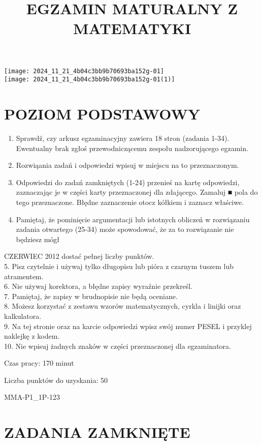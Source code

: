 \documentclass[10pt]{article}
\title{EGZAMIN MATURALNY Z MATEMATYKI }
\author{}
\date{}
\begin{document}
\maketitle
\texttt{[image: 2024\_11\_21\_4b04c3bb9b70693ba152g-01]}\\
\texttt{[image: 2024\_11\_21\_4b04c3bb9b70693ba152g-01(1)]}

\section*{POZIOM PODSTAWOWY}
\begin{enumerate}
  \item Sprawdź, czy arkusz egzaminacyjny zawiera 18 stron (zadania 1-34). Ewentualny brak zgłoś przewodniczącemu zespołu nadzorującego egzamin.
  \item Rozwiąania zadań i odpowiedzi wpisuj w miejscu na to przeznaczonym.
  \item Odpowiedzi do zadań zamkniętych (1-24) przenieś na kartę odpowiedzi, zaznaczając je w części karty przeznaczonej dla zdającego. Zamaluj ■ pola do tego przeznaczone. Błędne zaznaczenie otocz kółkiem i zaznacz właściwe.
  \item Pamiętaj, że pominięcie argumentacji lub istotnych obliczeń w rozwiązaniu zadania otwartego (25-34) może spowodować, że za to rozwiązanie nie będziesz mógł
\end{enumerate}

CZERWIEC 2012 dostać pełnej liczby punktów.\\
5. Pisz czytelnie i używaj tylko długopisu lub pióra z czarnym tuszem lub atramentem.\\
6. Nie używaj korektora, a błędne zapisy wyraźnie przekreśl.\\
7. Pamiętaj, że zapisy w brudnopisie nie będą oceniane.\\
8. Możesz korzystać z zestawu wzorów matematycznych, cyrkla i linijki oraz kalkulatora.\\
9. Na tej stronie oraz na karcie odpowiedzi wpisz swój numer PESEL i przyklej naklejkę z kodem.\\
10. Nie wpisuj żadnych znaków w części przeznaczonej dla egzaminatora.

Czas pracy: 170 minut

Liczba punktów do uzyskania: 50

MMA-P1\_1P-123

\section*{ZADANIA ZAMKNIĘTE}
\end{document}
